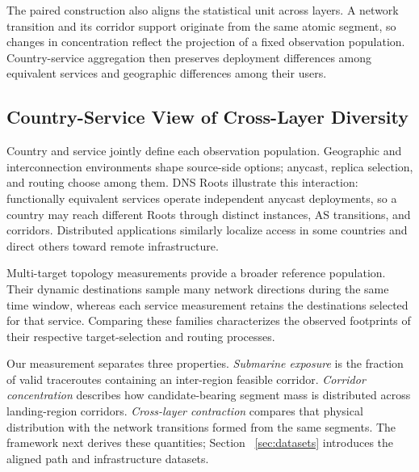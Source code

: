 The paired construction also aligns the statistical unit across layers. A
network transition and its corridor support originate from the same atomic
segment, so changes in concentration reflect the projection of a fixed
observation population. Country-service aggregation then preserves deployment
differences among equivalent services and geographic differences among their
users.

\subsection{Country-Service View of Cross-Layer Diversity}
\label{sec:background_motivation}

Country and service jointly define each observation population. Geographic and
interconnection environments shape source-side options; anycast, replica
selection, and routing choose among them. DNS Roots illustrate this interaction:
functionally equivalent services operate independent anycast deployments, so a
country may reach different Roots through distinct instances, AS transitions,
and corridors. Distributed applications similarly localize access in some
countries and direct others toward remote infrastructure.

Multi-target topology measurements provide a broader reference population.
Their dynamic destinations sample many network directions during the same time
window, whereas each service measurement retains the destinations selected for
that service. Comparing these families characterizes the observed footprints of
their respective target-selection and routing processes.

Our measurement separates three properties. \emph{Submarine exposure} is the
fraction of valid traceroutes containing an inter-region feasible corridor.
\emph{Corridor concentration} describes how candidate-bearing segment mass is
distributed across landing-region corridors. \emph{Cross-layer contraction}
compares that physical distribution with the network transitions formed from
the same segments. The framework next derives these quantities; Section
~\ref{sec:datasets} introduces the aligned path and infrastructure datasets.

